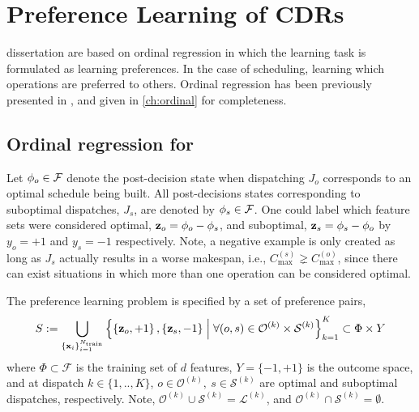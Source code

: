 
\chapter{Preference Learning of CDRs}\label{ch:prefmodels} 
 dissertation are based on ordinal regression in which the learning task is formulated as learning preferences. In the case of scheduling, learning which operations are preferred to others. Ordinal regression has been previously presented in \cite{Ru06:PPSN}, and given in \cref{ch:ordinal} for completeness. 

\section{Ordinal regression for \jsp}
Let ${\mathbf{\phi}}_{o}\in\mathcal{F}$ denote the post-decision state when dispatching $J_o$ corresponds to an optimal schedule being built. All post-decisions states corresponding to suboptimal dispatches, $J_s$, are denoted by ${\mathbf{\phi}}_{s}\in\mathcal{F}$. One could label which feature sets were considered optimal, $\mathbf{z}_{o}={\mathbf{\phi}}_{o}-{\mathbf{\phi}}_{s}$, and suboptimal, $\mathbf{z}_{s}={\mathbf{\phi}}_{s}-{\mathbf{\phi}}_{o}$ by $y_o=+1$ and $y_s=-1$ respectively. 
Note, a negative example is only created as long as $J_s$ actually results in a worse makespan, i.e., $C_{\max}^{(s)}\gneq C_{\max}^{(o)}$, since there can exist situations in which more than one operation can be considered optimal.

The preference learning problem is specified by a set of preference pairs,
\begin{equation}\label{eq:S:jsp}
	S := \bigcup_{\{\vec{x}_i\}_{i=1}^{N_{\text{train}}}}
    \condset{
        \left\{\vec{z}_o,+1\right\},\left\{\vec{z}_s,-1\right\}}{\forall (o,s) 
        \in \mathcal{O}^{(k)} \times \mathcal{S}^{(k)}}_{k=1}^K 
    \subset \Phi\times Y 
\end{equation}
where $\Phi\subset\mathcal{F}$ is the training set of $d$ features, 
$Y=\{-1,+1\}$ is the outcome space, and at dispatch $k\in\{1,..,K\}$, 
$o\in\mathcal{O}^{(k)},~s\in \mathcal{S}^{(k)}$
are optimal and suboptimal dispatches, respectively.
Note, $\mathcal{O}^{(k)}\cup\mathcal{S}^{(k)}=\mathcal{L}^{(k)}$, and 
$\mathcal{O}^{(k)}\cap\mathcal{S}^{(k)}=\emptyset$. 


